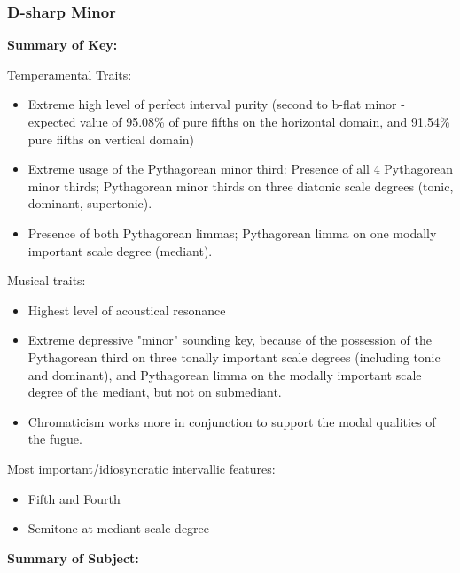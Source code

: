     \subsubsection{D-sharp Minor}\label{d-sharp-minor}

\textbf{Summary of Key:}


    \begin{center}
    \end{center}
    
    Temperamental Traits:

\begin{itemize}
\tightlist
\item
  Extreme high level of perfect interval purity (second to b-flat minor
  - expected value of 95.08\% of pure fifths on the horizontal domain,
  and 91.54\% pure fifths on vertical domain)
\item
  Extreme usage of the Pythagorean minor third: Presence of all 4
  Pythagorean minor thirds; Pythagorean minor thirds on three diatonic
  scale degrees (tonic, dominant, supertonic).
\item
  Presence of both Pythagorean limmas; Pythagorean limma on one modally
  important scale degree (mediant).
\end{itemize}

Musical traits:

\begin{itemize}
\tightlist
\item
  Highest level of acoustical resonance
\item
  Extreme depressive "minor" sounding key, because of the possession of
  the Pythagorean third on three tonally important scale degrees
  (including tonic and dominant), and Pythagorean limma on the modally
  important scale degree of the mediant, but not on submediant.
\item
  Chromaticism works more in conjunction to support the modal qualities
  of the fugue.
\end{itemize}

Most important/idiosyncratic intervallic features:

\begin{itemize}
\tightlist
\item
  Fifth and Fourth
\item
  Semitone at mediant scale degree
\end{itemize}

\textbf{Summary of Subject:}



